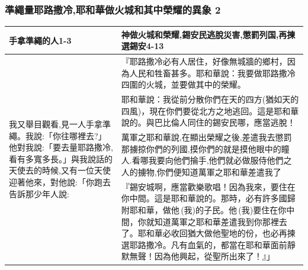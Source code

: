 \subsubsection{準繩量耶路撒冷,耶和華做火城和其中榮耀的異象 2}
\begin{table}[H]
\centering 
\begin{tabular}{p{2.8cm}|p{14.75cm}}\hline\hline
手拿準繩的人1-3&神做火城和榮耀,錫安民逃脫災害,懲罰列国,再揀選錫安4-13\\\hline
\multirow{4}{3.cm}{我又舉目觀看,見一人手拿準繩。我說:「你往哪裡去?」他對我說:「要去量耶路撒冷,看有多寬多長。」與我說話的天使去的時候,又有一位天使迎著他來，對他說:「你跑去告訴那少年人說:}
&『耶路撒冷必有人居住，好像無城牆的鄉村，因為人民和牲畜甚多。耶和華說：我要做耶路撒冷四圍的火城，並要做其中的榮耀。\\\cline{2-2}
&耶和華說：我從前分散你們在天的四方(猶如天的四風)，現在你們要從北方之地逃回。這是耶和華說的。與巴比倫人同住的錫安民哪，應當逃脫！\\\cline{2-2}
&萬軍之耶和華說,在顯出榮耀之後,差遣我去懲罰那擄掠你們的列國,摸你們的就是摸他眼中的瞳人.看哪我要向他們掄手,他們就必做服侍他們之人的擄物,你們便知道萬軍之耶和華差遣我了\\\cline{2-2}
&『錫安城啊，應當歡樂歌唱！因為我來，要住在你中間。這是耶和華說的。那時，必有許多國歸附耶和華，做他 (我)的子民。他 (我)要住在你中間，你就知道萬軍之耶和華差遣我到你那裡去了。耶和華必收回猶大做他聖地的份，也必再揀選耶路撒冷。凡有血氣的，都當在耶和華面前靜默無聲！因為他興起，從聖所出來了！』」\\\hline
\end{tabular}
\end{table}



